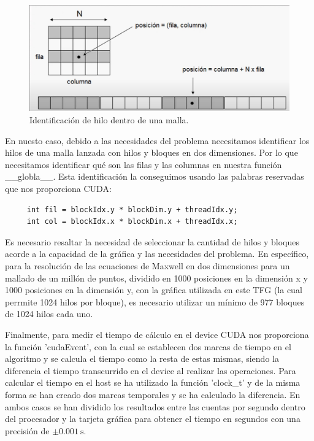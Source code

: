 \documentclass[11pt,a4paper,twoside,pdf]{article}
\numberwithin{equation}{section}
\begin{document}
\begin{figure}[h]
\centering
\includegraphics[width=10 cm]{Nvidia_Posicion_hilo.jpg}				
\caption{Identificación de hilo dentro de una malla.}
\label{fig:localizacion de hilos}
\end{figure}
\noindent

En nuesto caso, debido a las necesidades del problema necesitamos identificar los hilos de una malla lanzada con hilos y bloques en dos dimensiones. Por lo que necesitamos identificar qué son las filas y las columnas en nuestra función \_\_globla\_\_. Esta identificación la conseguimos usando las palabras reservadas que nos proporciona CUDA:

\begin{verbatim}
     int fil = blockIdx.y * blockDim.y + threadIdx.y;
     int col = blockIdx.x * blockDim.x + threadIdx.x;
\end{verbatim}

Es necesario resaltar la necesidad de seleccionar la cantidad de hilos y bloques acorde a la capacidad de la gráfica y las necesidades del problema. En específico, para la resolución de las ecuaciones de Maxwell en dos dimensiones para un mallado de un millón de puntos, dividido en 1000 posiciones en la dimensión x y 1000 posiciones en la dimensión y, con la gráfica utilizada en este TFG (la cual perrmite 1024 hilos por bloque), es necesario utilizar un mínimo de 977 bloques de 1024 hilos cada uno.


Finalmente, para medir el tiempo de cálculo en el device CUDA nos proporciona la función 'cudaEvent', con la cual se establecen dos marcas de tiempo en el algoritmo y se calcula el tiempo como la resta de estas mismas, siendo la diferencia el tiempo transcurrido en el device al realizar las operaciones.
Para calcular el tiempo en el host se ha utilizado la función 'clock\_t' y de la misma forma se han creado dos marcas temporales y se ha calculado la diferencia. En ambos casos se han dividido los resultados entre las cuentas por segundo dentro del procesador y la tarjeta gráfica para obtener el tiempo en segundos con una precisión de $\pm \SI{0.001}{\second}$.
\end{document}
